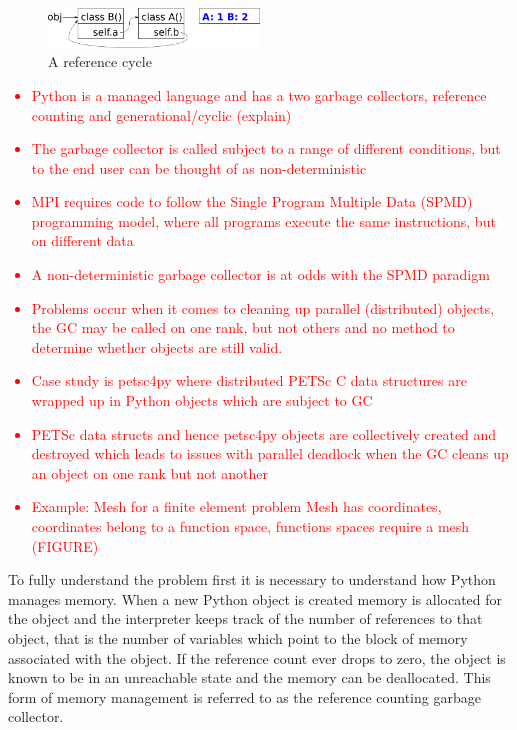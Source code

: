 \documentclass[10pt,journal,compsoc]{IEEEtran}
\newcommand{\jacknotes}[1]{\textcolor{red}{#1}}
\begin{document}
\begin{figure}
	\includegraphics[width=0.5\textwidth]{gc_generational/2.png}
	\caption{A reference cycle}
	\label{fig:ref_cycle}
\end{figure}

\jacknotes{
\begin{itemize}
	\item Python is a managed language and has a two garbage collectors, reference counting and generational/cyclic (explain)
	\item The garbage collector is called subject to a range of different conditions, but to the end user can be thought of as non-deterministic
	\item MPI requires code to follow the Single Program Multiple Data (SPMD) programming model, where all programs execute the same instructions, but on different data
	\item A non-deterministic garbage collector is at odds with the SPMD paradigm
	\item Problems occur when it comes to cleaning up parallel (distributed) objects, the GC may be called on one rank, but not others and no method to determine whether objects are still valid.
	\item Case study is petsc4py where distributed PETSc C data structures are wrapped up in Python objects which are subject to GC
	\item PETSc data structs and hence petsc4py objects are collectively created and destroyed which leads to issues with parallel deadlock when the GC cleans up an object on one rank but not another
	\item Example: Mesh for a finite element problem Mesh has coordinates, coordinates belong to a function space, functions spaces require a mesh (FIGURE) 
\end{itemize}
}

To fully understand the problem first it is necessary to understand how Python manages memory.
When a new Python object is created memory is allocated for the object and the interpreter keeps track of the number of references to that object, that is the number of variables which point to the block of memory associated with the object.
If the reference count ever drops to zero, the object is known to be in an unreachable state and the memory can be deallocated.
This form of memory management is referred to as the reference counting garbage collector.
\end{document}
